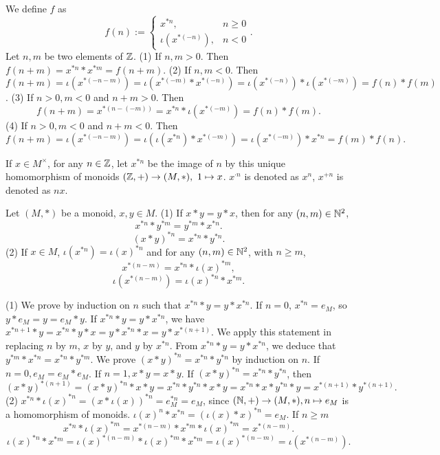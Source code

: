 \documentclass{book}
\numberwithin{equation}{section}
\begin{document}
\begin{proofenv}
    We define $f$ as 
    $$f(n):=\left\{\begin{matrix}
        x^{*n}, &n\ge 0\\
        \iota(x^{*(-n)}), &n<0
    \end{matrix}\right. .$$
    Let $n, m$ be two elements of $\mathbb{Z}$.
    \newline
    (1) If $n, m>0$. Then $f(n+m)=x^{*n}*x^{*m}=f(n+m)$.
    \newline
    (2) If $n, m<0$. Then $f(n+m)=\iota(x^{*(-n-m)})=\iota(x^{*(-m)}*x^{*(-n)})=\iota(x^{*(-n)})*\iota(x^{*(-m)})=f(n)*f(m)$.
    \newline
    (3) If $n>0, m<0$ and $n+m>0$. Then $$f(n+m)=x^{*(n-(-m))}=x^{*n}*\iota(x^{*(-m)})=f(n)*f(m).$$
    (4) If $n>0, m<0$ and $n+m<0$. Then $$f(n+m)=\iota(x^{*(-n-m)})=\iota(\iota(x^{*n})*x^{*(-m)})=\iota(x^{*(-m)})*x^{*n}=f(m)*f(n).$$
\end{proofenv}
\begin{notationenv}
    If $x\in M^\times$,  for any $n\in \mathbb{Z}$,  let $x^{*n}$ be the image of $n$ by this unique homomorphism of monoids $(\mathbb{Z}, +)\rightarrow (M, *), \ 1\mapsto x$. $x^{\cdot n}$ is denoted as $x^n$,  $x^{+n}$ is denoted as $nx$.
\end{notationenv}
\begin{propositionenv}
    Let $(M, *)$ be a monoid,  $x, y\in M$.
    \newline
    (1) If $x*y=y*x$,  then for any $(n, m)\in \mathbb{N}^2$, 
     $$x^{*n}*y^{*m}=y^{*m}*x^{*n}.$$ 
     $$(x*y)^{*n}=x^{*n}*y^{*n}.$$
    \newline
    (2) If $x\in M$,  $\iota(x^{*n})=\iota(x)^{*n}$ and for any $(n, m)\in \mathbb{N}^2$,  with $n\ge m$, 
    $$x^{*(n-m)}=x^{*n}*\iota(x)^{*m}, $$
    $$\iota(x^{*(n-m)})=\iota(x)^{*n}*x^{*m}.$$
\end{propositionenv}
\begin{proofenv}
   \quad
   \newline
    (1) We prove by induction on $n$ such that $x^{*n}*y=y*x^{*n}$.
    If $n=0$,  $x^{*n}=e_M$,  so $y*e_M=y=e_M*y$. If $x^{*n}*y=y*x^{*n}$,  we have $x^{*n+1}*y=x^{*n}*y*x=y*x^{*n}*x=y*x^{*(n+1)}$. We apply this  statement in replacing $n$ by $m$,  $x$ by $y$,  and $y$ by $x^{*n}$. From $x^{*n}*y=y*x^{*n}$,  we deduce that $y^{*m}*x^{*n}=x^{*n}*y^{*m}$. We prove $(x*y)^{*n}=x^{*n}*y^{*n}$ by induction on $n$. If $n=0, e_M=e_M*e_M$. If $n=1, x*y=x*y$. If $(x*y)^{*n}=x^{*n}*y^{*n}$,  then $$(x*y)^{*(n+1)}=(x*y)^{*n}*x*y=x^{*n}*y^{*n}*x*y=x^{*n}*x*y^{*n}*y=x^{*(n+1)}*y^{*(n+1)}.$$
    (2) $x^{*n}*\iota(x)^{*n}=(x*\iota(x))^{*n}=e_{M}^{*n} = e_{M}$,  since $(\mathbb{N}, +)\rightarrow (M, *),  n\mapsto e_M$ is a homomorphism of monoids. $\iota(x)^n* x^{*n} = (\iota(x) * x)^{*n} = e_{M}$. If $n \geq m$ 
$$
x^{*n} * \iota(x)^{*m} = x^{*(n-m)} * x^{*m} * \iota(x)^{*m} = x^{*(n-m)}
.$$
$$
\iota(x)^{*n} * x^{*m} = \iota(x)^{*(n-m)} * \iota(x)^{*m} * x^{*m}=\iota(x)^{*(n-m)}=\iota(x^{*(n-m)})
.$$
\end{proofenv}
\end{document}
